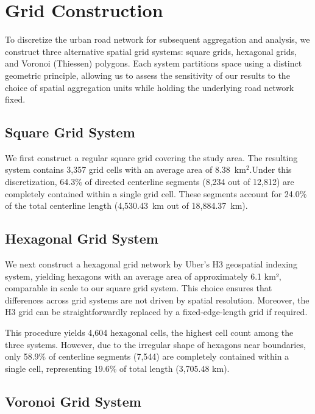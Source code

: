 \documentclass[12pt]{article}
\begin{document}
	\clearpage

	
	
	
	
	
	
	\section{Grid Construction}
	
	To discretize the urban road network for subsequent aggregation and analysis, we construct three alternative spatial grid systems: square grids, hexagonal grids, and Voronoi (Thiessen) polygons. Each system partitions space using a distinct geometric principle, allowing us to assess the sensitivity of our results to the choice of spatial aggregation units while holding the underlying road network fixed.
	
	\subsection{Square Grid System}
	
	We first construct a regular square grid covering the study area. The resulting system contains 3,357 grid cells with an average area of 8.38~km$^2$.Under this discretization, 64.3\% of directed centerline segments (8,234 out of 12,812) are completely contained within a single grid cell. These segments account for 24.0\% of the total centerline length (4,530.43~km out of 18,884.37~km). 
	
	\subsection{Hexagonal Grid System}
	
	We next construct a hexagonal grid network by Uber's H3 geospatial indexing system, yielding hexagons with an average area of approximately 6.1 km², comparable in scale to our square grid system. This choice ensures that differences across grid systems are not driven by spatial resolution. Moreover, the H3 grid can be straightforwardly replaced by a fixed-edge-length grid if required.
	
	This procedure yields 4,604 hexagonal cells, the highest cell count among the three systems. However, due to the irregular shape of hexagons near boundaries, only 58.9\% of centerline segments (7,544) are completely contained within a single cell, representing 19.6\% of total length (3,705.48 km).
	
	\subsection{Voronoi Grid System}
	
\end{document}
